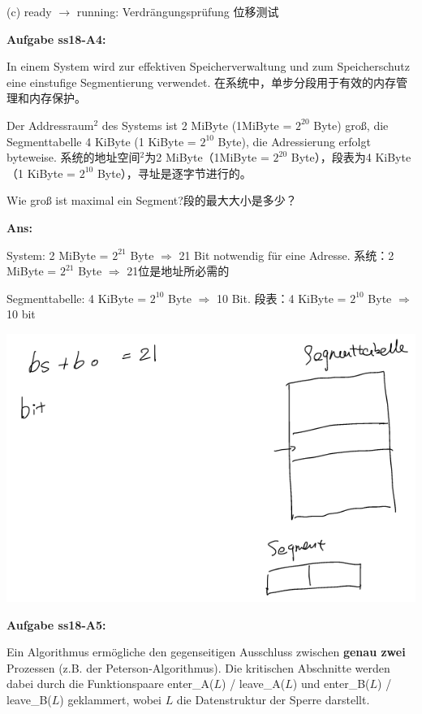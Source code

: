 \documentclass[fleqn]{article}
\begin{document}
(c) ready $\rightarrow$ running: Verdrängungsprüfung 位移测试

\noindent\textbf{Aufgabe ss18-A4:}

In einem System wird zur effektiven Speicherverwaltung und zum Speicherschutz eine einstufige Segmentierung verwendet.
在系统中，单步分段用于有效的内存管理和内存保护。

Der Addressraum$^2$ des Systems ist 2 MiByte (1MiByte = $2^{20}$ Byte) groß, die Segmenttabelle 4 KiByte (1 KiByte = $2^{10}$ Byte), die Adressierung erfolgt byteweise.
系统的地址空间$ ^2 $为2 MiByte（1MiByte = $ 2^{20} $ Byte），段表为4 KiByte（1 KiByte = $ 2^{10} $ Byte），寻址是逐字节进行的。

Wie groß ist maximal ein Segment?段的最大大小是多少？

\textbf{Ans:}

System: 2 MiByte = $2^{21}$ Byte $\Rightarrow$ 21 Bit notwendig für eine Adresse.
系统：2 MiByte = $ 2^{21} $ Byte $ \Rightarrow $ 21位是地址所必需的

Segmenttabelle: 4 KiByte = $2^{10}$ Byte $\Rightarrow$ 10 Bit.
段表：4 KiByte = $ 2^{10} $ Byte $ \Rightarrow $ 10 bit

\begin{center}
    \includegraphics[scale = 0.4]{bild3.png}
\end{center}
\noindent\textbf{Aufgabe ss18-A5:}

Ein Algorithmus ermögliche den gegenseitigen Ausschluss zwischen \textbf{genau zwei} Prozessen 
(z.B. der Peterson-Algorithmus). Die kritischen Abschnitte werden dabei durch die 
Funktionspaare enter\_A($L$) / leave\_A($L$) und enter\_B($L$) / leave\_B($L$) geklammert, 
wobei $L$ die Datenstruktur der Sperre darstellt.
\end{document}
